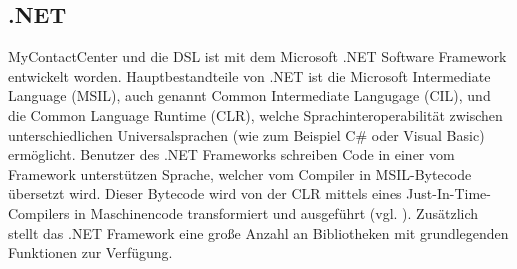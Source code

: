 \subsection{.NET}
MyContactCenter und die DSL ist mit dem Microsoft .NET Software Framework entwickelt worden. Hauptbestandteile von .NET ist die Microsoft Intermediate Language (MSIL), auch genannt Common Intermediate Langugage (CIL), und die Common Language Runtime (CLR), welche Sprachinteroperabilität zwischen unterschiedlichen Universalsprachen (wie zum Beispiel C\# oder Visual Basic) ermöglicht. Benutzer des .NET Frameworks schreiben Code in einer vom Framework unterstützen Sprache, welcher vom Compiler in MSIL-Bytecode übersetzt wird. Dieser Bytecode wird von der CLR mittels eines Just-In-Time-Compilers in Maschinencode transformiert und ausgeführt (vgl. \cite[S. 16ff]{Platt:03}). Zusätzlich stellt das .NET Framework eine große Anzahl an Bibliotheken mit grundlegenden Funktionen zur Verfügung. 

